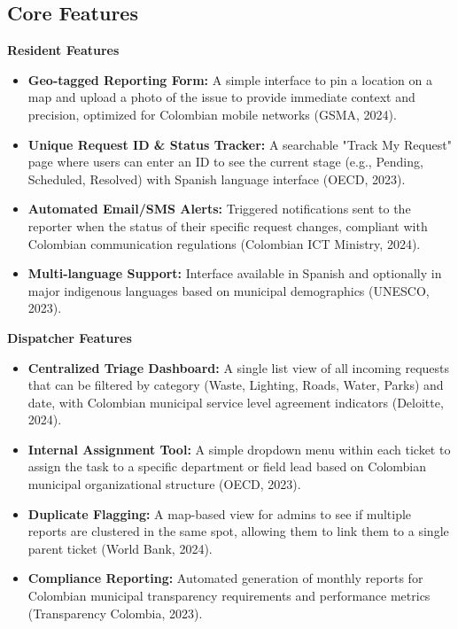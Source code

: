 \documentclass[12pt,a4paper]{article}
\begin{document}
\subsection{Core Features}

\textbf{Resident Features}
\begin{itemize}
    \item \textbf{Geo-tagged Reporting Form:} A simple interface to pin a location on a map and upload a photo of the issue to provide immediate context and precision, optimized for Colombian mobile networks (GSMA, 2024).
    \item \textbf{Unique Request ID \& Status Tracker:} A searchable "Track My Request" page where users can enter an ID to see the current stage (e.g., Pending, Scheduled, Resolved) with Spanish language interface (OECD, 2023).
    \item \textbf{Automated Email/SMS Alerts:} Triggered notifications sent to the reporter when the status of their specific request changes, compliant with Colombian communication regulations (Colombian ICT Ministry, 2024).
    \item \textbf{Multi-language Support:} Interface available in Spanish and optionally in major indigenous languages based on municipal demographics (UNESCO, 2023).
\end{itemize}

\textbf{Dispatcher Features}
\begin{itemize}
    \item \textbf{Centralized Triage Dashboard:} A single list view of all incoming requests that can be filtered by category (Waste, Lighting, Roads, Water, Parks) and date, with Colombian municipal service level agreement indicators (Deloitte, 2024).
    \item \textbf{Internal Assignment Tool:} A simple dropdown menu within each ticket to assign the task to a specific department or field lead based on Colombian municipal organizational structure (OECD, 2023).
    \item \textbf{Duplicate Flagging:} A map-based view for admins to see if multiple reports are clustered in the same spot, allowing them to link them to a single parent ticket (World Bank, 2024).
    \item \textbf{Compliance Reporting:} Automated generation of monthly reports for Colombian municipal transparency requirements and performance metrics (Transparency Colombia, 2023).
\end{itemize}
\end{document}

